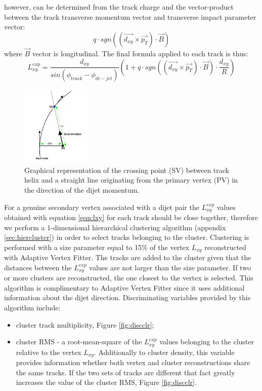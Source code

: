 \begin{enumerate}
however,  can be
determined from the track charge and the vector-product between the track transverse momentum vector and transverse
impact parameter vector:
\begin{equation}
q\cdot sgn((\vec{d_{xy}}\times\vec{p_T}) \cdot \vec{B})
\end{equation}   
where $\vec{B}$ vector is longitudinal. The final formula applied to each track is thus:
\begin{equation}
 L_{xy}^{exp} = \frac{d_{xy}}{sin(\phi_{track} - \phi_{di-jet})} (1 + q\cdot sgn((\vec{d_{xy}}\times\vec{p_T}) \cdot \vec{B}) \cdot \frac{d_{xy}}{R})
\label{eqn:lxy}
\end{equation}


\begin{figure}
\centering
\includegraphics[width=0.3\textwidth]{plots/guessLxy.png}
\caption{Graphical representation of the crossing point (SV) between track helix and a straight line originating from the primary vertex (PV) in the direction of the dijet momentum. \label{fig:guesslxydiagram}}
\end{figure} 

For a genuine secondary vertex associated with a dijet pair the $L_{xy}^{exp}$ values obtained with equation
\ref{eqn:lxy} for each track should be close
 together, therefore we perform a 1-dimensional hierarchical clustering algorithm (appendix \ref{sec:hiercluster})
in order to select tracks belonging to the cluster. 
Clustering is performed with a size parameter equal to 15\% of 
the vertex $L_{xy}$ reconstructed with Adaptive Vertex Fitter. 
The tracks are added to the cluster given that the distances between the $L_{xy}^{exp}$
values are not larger than the size parameter. 
 If two or more clusters 
are reconstructed, the one closest to the vertex is selected. 
This algorithm is complimentary to Adaptive Vertex Fitter
since it uses additional information about the dijet direction. Discriminating variables provided
 by this algorithm include:
\begin{itemize}
\item cluster track multiplicity, Figure \ref{fig:discclr};
\item cluster RMS - a root-mean-square of the $L_{xy}^{exp}$ values belonging to the cluster
 relative to the vertex $L_{xy}$. Additionally to cluster density, this
variable provides information whether both vertex and cluster reconstructions share the same tracks.
 If the two sets of tracks
are different that fact greatly increases the value of the cluster RMS, Figure \ref{fig:discclr}. 
\end{itemize}


\end{enumerate}
